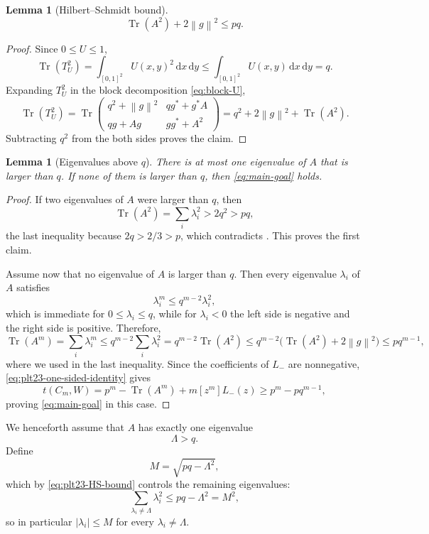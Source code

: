 \documentclass[11pt]{article}
\newtheorem{lemma}[theorem]{Lemma}
\numberwithin{equation}{section}
\newcommand{\norm}[1]{\left\lVert #1\right\rVert}
\newcommand{\Tr}{\operatorname{Tr}}
\newcommand{\dd}{\,\mathrm d}
\begin{document}
\begin{lemma}[Hilbert--Schmidt bound]\label{lem:plt23-HS-bound}
  \begin{equation}\label{eq:plt23-HS-bound}
    \Tr(A^2)+2\norm g^2\le pq.
  \end{equation}
\end{lemma}

\begin{proof}
  Since $0\le U\le1$,
  \[
    \Tr(T_U^2)=\int_{[0,1]^2}U(x,y)^2\dd x\dd y
    \le\int_{[0,1]^2}U(x,y)\dd x\dd y=q.
  \]
  Expanding $T_U^2$ in the block decomposition \eqref{eq:block-U},
  \[
    \Tr(T_U^2)=\Tr\begin{pmatrix}q^2 + \norm g^2 & q g^* + g^* A \\ qg + Ag & g g^* + A^2\end{pmatrix}=q^2+2\norm g^2+\Tr(A^2).
  \]
  Subtracting $q^2$ from the both sides proves the claim.
\end{proof}

\begin{lemma}[Eigenvalues above $q$]\label{lem:plt23-eigenvalues-above-q}
  There is at most one eigenvalue of $A$ that is larger than $q$.
  If none of them is larger than $q$, then \eqref{eq:main-goal} holds.
\end{lemma}

\begin{proof}
  If two eigenvalues of $A$ were larger than $q$, then
  \[
    \Tr(A^2)=\sum_i\lambda_i^2>2q^2>pq,
  \]
  the last inequality because $2q>2/3>p$, which contradicts .
  This proves the first claim.

  Assume now that no eigenvalue of $A$ is larger than $q$.
  Then every eigenvalue $\lambda_i$ of $A$ satisfies
  \[
    \lambda_i^m\le q^{m-2}\lambda_i^2,
  \]
  which is immediate for $0\le\lambda_i\le q$, while for $\lambda_i<0$ the left side is negative and the right side is positive.
  Therefore,
  \[
    \Tr(A^m) = \sum_{i}\lambda_i^m\le q^{m-2} \sum_{i} \lambda_i^2 = q^{m-2} \Tr(A^2) \le q^{m-2} \bigl(\Tr(A^2) + 2\norm g^2\bigr) \le pq^{m-1},
  \]
  where we used  in the last inequality.
  Since the coefficients of $L_-$ are nonnegative, \eqref{eq:plt23-one-sided-identity} gives
  \[
    t(C_m,W) = p^m - \Tr(A^m) + m[z^m]L_-(z) \ge p^m - pq^{m-1},
  \]
  proving \eqref{eq:main-goal} in this case.
\end{proof}

We henceforth assume that $A$ has exactly one eigenvalue
\begin{equation}\label{eq:plt23-Lambda-above-q}
  \Lambda>q.
\end{equation}
Define
\begin{equation}\label{eq:plt23-M-def}
  M=\sqrt{pq-\Lambda^2},
\end{equation}
which by \eqref{eq:plt23-HS-bound} controls the remaining eigenvalues:
\[
  \sum_{\lambda_i\ne\Lambda}\lambda_i^2\le pq-\Lambda^2=M^2,
\]
so in particular $|\lambda_i|\le M$ for every $\lambda_i\ne\Lambda$.
\end{document}
